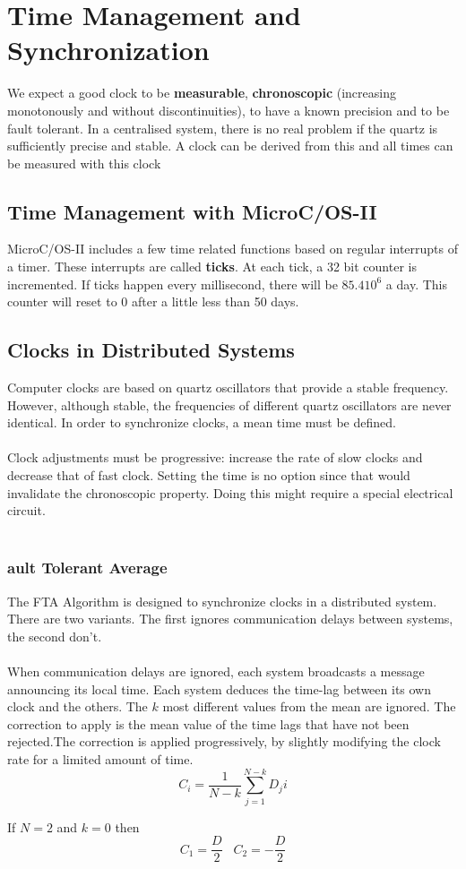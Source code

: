\documentclass[../main.tex]{subfiles}
\begin{document}
\section{Time Management and Synchronization}
We expect a good clock to be \textbf{measurable}, \textbf{chronoscopic} (increasing monotonously and without discontinuities), to have a known precision and to be fault tolerant. In a centralised system, there is no real problem if the quartz is sufficiently precise and stable. A clock can be derived from this and all times can be measured with this clock

\subsection{Time Management with MicroC/OS-II}
MicroC/OS-II includes a few time related functions based on regular interrupts of a timer. These interrupts are called \textbf{ticks}. At each tick, a 32 bit counter is incremented. If ticks happen every millisecond, there will be $85.4 10^6$ a day. This counter will reset to 0 after a little less than 50 days.

\subsection{Clocks in Distributed Systems}
Computer clocks are based on quartz oscillators that provide a stable frequency. However, although stable, the frequencies of different quartz oscillators are never identical. In order to synchronize clocks, a mean time must be defined.
\\\\
Clock adjustments must be progressive: increase the rate of slow clocks and decrease that of fast clock. Setting the time is no option since that would invalidate the chronoscopic property. Doing this might require a special electrical circuit.
\\\\
\subsubsection{ault Tolerant Average}
The FTA Algorithm is designed to synchronize clocks in a distributed system. There are two variants. The first ignores communication delays between systems, the second don't.
\\\\
When communication delays are ignored, each system broadcasts a message announcing its local time. Each system deduces the time-lag between its own clock and the others. The $k$ most different values from the mean are ignored. The correction to apply is the mean value of the time lags that have not been rejected.The correction is applied progressively, by slightly modifying the clock rate for a limited amount of time.
\[
C_i = \frac{1}{N-k}\sum^{N-k}_{j=1}D_ji
\]
\begin{exmp}
If $N = 2$ and $k=0$ then
\[
C_1 = \frac{D}{2} \;\;\; C_2 = -\frac{D}{2}
\]
\end{exmp}
\end{document}
